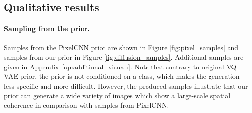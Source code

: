 \documentclass[nohyperref]{article}
\theoremstyle{plain}
\theoremstyle{definition}
\theoremstyle{remark}
\begin{document}

\subsection{Qualitative results}
\paragraph{Sampling from the prior. }
Samples from the PixelCNN prior are shown in Figure \ref{fig:pixel_samples}
and samples from our prior in Figure \ref{fig:diffusion_samples}. Additional samples are given in Appendix~\ref{ap:additional_visuals}. Note that contrary to original VQ-VAE prior, the prior is not conditioned on a class, which makes the generation less specific and more difficult. However, the produced samples illustrate that our prior can generate a wide variety of images which show a large-scale spatial coherence in comparison with samples from PixelCNN. 
\end{document}

